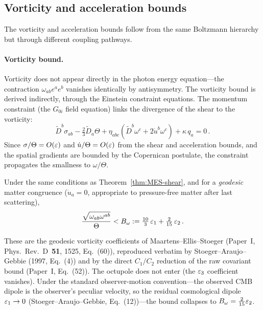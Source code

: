 \subsection{Vorticity and acceleration bounds}
\label{sec:om-udot-bounds}

The vorticity and acceleration bounds follow from the same
Boltzmann hierarchy but through different coupling pathways.

\paragraph{Vorticity bound.}
Vorticity does not appear directly in the photon energy
equation---the contraction $\omega_{ab}e^a e^b$ vanishes
identically by antisymmetry.  The vorticity bound is derived
indirectly, through the Einstein constraint equations.  The
momentum constraint (the $G_{0i}$ field equation) links the
divergence of the shear to the vorticity:
\begin{equation}\label{eq:momentum-constraint}
\tilde{D}^b\sigma_{ab} - \tfrac{2}{3}\tilde{D}_a\Theta
+ \eta_{abc}(\tilde{D}^b\omega^c + 2\dot{u}^b\omega^c)
+ \kappa\,q_a = 0\,.
\end{equation}
Since $\sigma/\Theta = O(\varepsilon)$ and $\dot{u}/\Theta = O(\varepsilon)$
from the shear and acceleration bounds, and the spatial gradients
are bounded by the Copernican postulate, the constraint
propagates the smallness to $\omega/\Theta$.

\begin{theorem}\label{thm:MES-omega}
Under the same conditions as Theorem~\ref{thm:MES-shear}, and for a
\emph{geodesic} matter congruence ($\dot{u}_a = 0$, appropriate to
pressure-free matter after last scattering),
\begin{equation}\label{eq:Bom-def}
\frac{\sqrt{\omega_{ab}\omega^{ab}}}{\Theta}
< B_\omega
:= \tfrac{10}{3}\,\varepsilon_1 + \tfrac{2}{15}\,\varepsilon_2\,.
\end{equation}
\end{theorem}

These are the geodesic vorticity coefficients of
Maartens--Ellis--Stoeger (Paper~I, Phys.~Rev.~D~\textbf{51}, 1525,
Eq.~(60)), reproduced verbatim by Stoeger--Araujo--Gebbie
(1997, Eq.~(4)) and by the direct $C_1/C_2$ reduction of the raw
covariant bound (Paper~I, Eq.~(52)).  The octupole does not enter (the
$\varepsilon_3$ coefficient vanishes).  Under the standard observer-motion
convention---the observed CMB dipole is the observer's peculiar
velocity, so the residual cosmological dipole $\varepsilon_1 \to 0$
(Stoeger--Araujo--Gebbie, Eq.~(12))---the bound collapses to
$B_\omega = \tfrac{2}{15}\varepsilon_2$.

